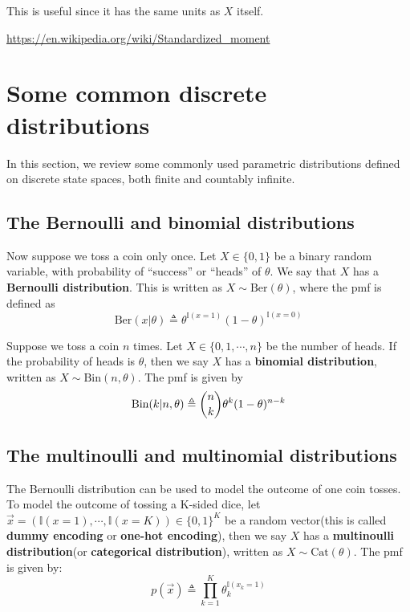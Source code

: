 \documentclass[graybox, envcountchap, twocolumn]{styles/svmult}
\begin{document}
This is useful since it has the same units as $X$ itself.

\url{https://en.wikipedia.org/wiki/Standardized_moment}

\section{Some common discrete distributions}
In this section, we review some commonly used parametric distributions defined on discrete state spaces, both finite and countably infinite.


\subsection{The Bernoulli and binomial distributions}

\begin{definition}
Now suppose we toss a coin only once. Let $X \in \{0,1\}$ be a binary random variable, with probability of “success” or “heads” of $\theta$. We say that $X$ has a \textbf{Bernoulli distribution}. This is written as $X \sim \text{Ber}(\theta)$, where the pmf is defined as 
\begin{equation}
\text{Ber}(x|\theta) \triangleq \theta^{\mathbb{I}(x=1)}(1-\theta)^{\mathbb{I}(x=0)}
\end{equation}
\end{definition}


\begin{definition}
Suppose we toss a coin $n$ times. Let $X \in \{0,1,\cdots,n\}$ be the number of heads. If the probability of heads is $\theta$, then we say $X$ has a \textbf{binomial distribution}, written as $X \sim \text{Bin}(n, \theta)$. The pmf is given by 
\begin{equation}\label{eqn:binomial-pmf}
\text{Bin}(k|n,\theta) \triangleq \dbinom{n}{k}\theta^k(1-\theta)^{n-k}
\end{equation}
\end{definition}


\subsection{The multinoulli and multinomial distributions}

\begin{definition}
The Bernoulli distribution can be used to model the outcome of one coin tosses. To model the outcome of tossing a K-sided dice, let $\vec{x} =(\mathbb{I}(x=1),\cdots,\mathbb{I}(x=K)) \in \{0,1\}^K$ be a random vector(this is called \textbf{dummy encoding} or \textbf{one-hot encoding}), then we say $X$ has a \textbf{multinoulli distribution}(or \textbf{categorical distribution}), written as $X \sim \text{Cat}(\theta)$. The pmf is given by: 
\begin{equation}
p(\vec{x}) \triangleq \prod\limits_{k=1}^K\theta_k^{\mathbb{I}(x_k=1)}
\end{equation}
\end{definition}
\end{document}
